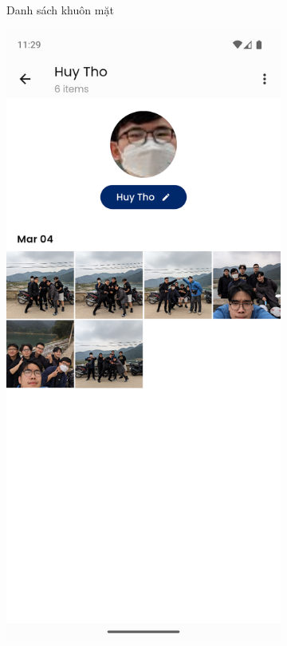 \begin{figure}[H]
\begin{subfigure}{0.32\textwidth}
        \caption{Danh sách khuôn mặt}
    \end{subfigure}
    \hfill
    \begin{subfigure}{0.32\textwidth}
        \includegraphics[width=1\linewidth]{figures/c4/4-2/face_2.png} 

\end{subfigure}
\end{figure}
